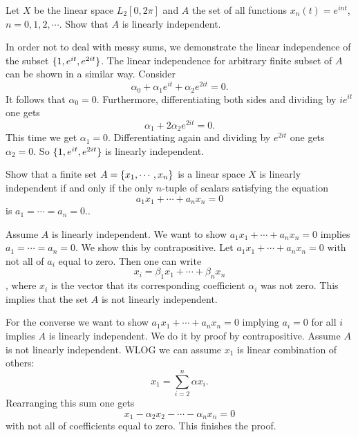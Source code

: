 \begin{problem}
	Let $ X $ be the linear space $ L_2[0,2\pi] $ and $ A $ the set of all functions $ x_n(t) = e^{int} $, $ n=0,1,2,\cdots $. Show that $ A $ is linearly independent.
\end{problem}
\begin{solution}
	In order not to deal with messy sums, we demonstrate the linear independence of the subset $ \{1,e^{it},e^{2it}\} $. The linear independence for arbitrary finite subset of $ A $ can be shown in a similar way. Consider
	\[ \alpha_0 + \alpha_1 e^{it} + \alpha_2e^{2it} = 0. \]
	It follows that $ \alpha_0 =0 $. Furthermore, differentiating both sides and dividing by $ ie^{it} $ one gets
	\[ \alpha_1 + 2\alpha_2 e^{2it} = 0. \]
	This time we get $ \alpha_1 = 0 $. Differentiating again and dividing by $ e^{2it} $ one gets
	$ \alpha_2 = 0 $. So $ \{1,e^{it},e^{2it}\}  $ is linearly independent.
\end{solution}

\begin{problem}
	Show that a finite set $ A = \{x_1,\cdots,x_n\} $ is a linear space $ X $ is linearly independent if and only if the only $ n $-tuple of scalars satisfying the equation
	\[ a_1x_1 + \cdots + a_nx_n = 0 \]
	is $ a_1 = \cdots = a_n = 0. $.
\end{problem}
\begin{solution}
	Assume $ A $ is linearly independent. We want to show $ a_1x_1 + \cdots + a_n x_n = 0 $ implies $ a_1=\cdots=a_n=0 $. We show this by contrapositive. Let $ a_1x_1 + \cdots + a_n x_n = 0 $ with not all of $ a_i $ equal to zero. Then one can write \[ x_i = \beta_1 x_1 + \cdots + \beta_n x_n \], where $ x_i $ is the vector that its corresponding coefficient $ \alpha_i $ was not zero. This implies that the set $ A $ is not linearly independent.
	
	For the converse we want to show $ a_1x_1 + \cdots + a_nx_n = 0 $ implying $ a_i = 0 $ for all $ i $ implies $ A $ is linearly independent. We do it by proof by contrapositive. Assume $ A $ is not linearly independent. WLOG we can assume $ x_1 $ is linear combination of others: 
	\[ x_1 = \sum_{i=2}^{n} \alpha x_i. \]
	Rearranging this sum one gets
	\[ x_1 - \alpha_2x_2 - \cdots - \alpha_nx_n = 0 \]
	with not all of coefficients equal to zero. This finishes the proof.
\end{solution}


